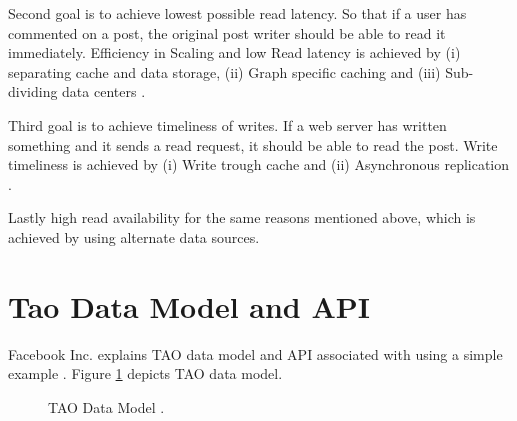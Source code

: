 \documentclass[9pt,twocolumn,twoside]{../../styles/osajnl}
\begin{document}
Second goal is to achieve lowest possible read latency. So that if a user has commented on a post, the original post writer should be able to read it immediately.
Efficiency in Scaling and low Read latency is achieved by (i) separating cache and data storage, (ii) Graph specific caching and (iii) Sub-dividing data centers \cite{www-tao4}.

Third goal is to achieve timeliness of writes. If a web server has written something and it sends a read request, it should be able to read the post. Write timeliness is achieved by (i) Write trough cache and (ii) Asynchronous replication \cite{www-tao4}.

Lastly high read availability for the same reasons mentioned above, which is achieved by using alternate data sources.

\section{Tao Data Model and API}
Facebook Inc. explains TAO data model and API associated with using a simple example \cite{www-tao2}. Figure \ref{fig:figure1} depicts TAO data model.

\begin{figure}[htbp]
\centering
{}
\caption{TAO Data Model \cite{www-tao2}.}
\label{fig:figure1}
\end{figure}
\end{document}
